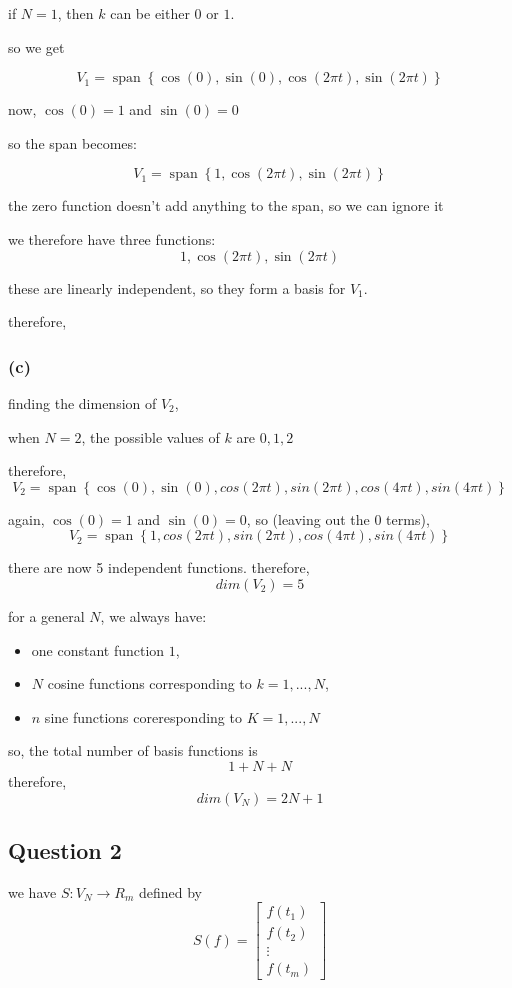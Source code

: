 \documentclass{article}
\begin{document}
if $N=1$, then $k$ can be either $0$ or $1$.

so we get

\[
V_1= \operatorname{span} \left\{ \cos(0),\sin(0), \cos(2\pi t),\sin(2\pi t) \right\}
\]

now, $\cos(0)=1$ and $\sin(0)=0$

so the span becomes:

\[
V_1= \operatorname{span} \left\{ 1,\cos(2\pi t),\sin(2\pi t) \right\}
\]

the zero function doesn't add anything to the span, so we can ignore it

we therefore have three functions:
\[
1,\cos(2\pi t),\sin(2\pi t)
\]

these are linearly independent, so they form a basis for \(V_1\).

therefore, 

\subsubsection*{(c)}
finding the dimension of $V_2$,

when $N=2$, the possible values of $k$ are $0,1,2$

therefore,
\[
V_2 = \operatorname{span} \left\{\cos(0), \sin(0), cos(2\pi t), sin(2\pi t), cos(4\pi t), sin(4\pi t) \right\}
\]

again, $\cos(0) = 1$ and $\sin(0) = 0$, so (leaving out the $0$ terms),
\[
V_2 = \operatorname{span} \left\{1, cos(2\pi t), sin(2\pi t), cos(4\pi t), sin(4\pi t) \right\}
\]

there are now 5 independent functions. therefore,
\[
\boxed{dim(V_2) = 5}
\]

for a general $N$, we always have:
\begin{itemize}
    \item one constant function $1$,
    \item $N$ cosine functions corresponding to $k=1,...,N$,
    \item $n$ sine functions coreresponding to $K=1,...,N$
\end{itemize}
so, the total number of basis functions is
\[
1+N+N
\]
therefore,
\[
\boxed{dim(V_N) = 2N + 1}
\]

\subsection{Question 2}

we have $S:V_N \rightarrow R_m$ defined by
\[
S(f) = 
\begin{bmatrix}
    f(t_1) \\
    f(t_2) \\
    \vdots \\
    f(t_m)
\end{bmatrix}
\]
\end{document}
